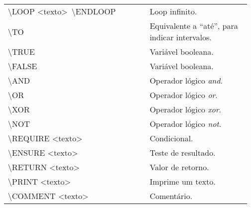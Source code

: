 \begin{tabular}{p{0.57\linewidth}p{0.4\linewidth}}
    \textbackslash\textsf{LOOP} \textless\textsf{texto}\textgreater \ \textbackslash\textsf{ENDLOOP} & Loop infinito. \\
    \textbackslash\textsf{TO} & Equivalente a ``até'', para indicar intervalos. \\
    \textbackslash\textsf{TRUE} & Variável booleana. \\
    \textbackslash\textsf{FALSE} & Variável booleana. \\
    \textbackslash\textsf{AND} & Operador lógico \textit{and}. \\
    \textbackslash\textsf{OR} & Operador lógico \textit{or}. \\
    \textbackslash\textsf{XOR} & Operador lógico \textit{xor}. \\
    \textbackslash\textsf{NOT} & Operador lógico \textit{not}. \\
    \textbackslash\textsf{REQUIRE} \textless\textsf{texto}\textgreater & Condicional. \\
    \textbackslash\textsf{ENSURE} \textless\textsf{texto}\textgreater & Teste de resultado. \\
    \textbackslash\textsf{RETURN} \textless\textsf{texto}\textgreater & Valor de retorno. \\
    \textbackslash\textsf{PRINT} \textless\textsf{texto}\textgreater & Imprime um texto. \\
    \textbackslash\textsf{COMMENT} \textless\textsf{texto}\textgreater & Comentário. \\ \hline
\end{tabular}
